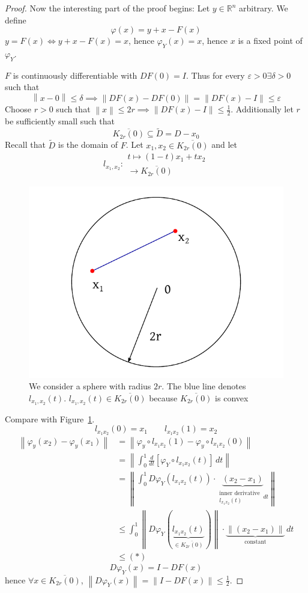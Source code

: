 \documentclass{article}
\newcommand{\norm}[1]{\left\|#1\right\|}
\begin{document}
\begin{proof}
  Now the interesting part of the proof begins:
  Let $y \in \mathbb R^n$ arbitrary. We define
  \[ \varphi(x) = y + x - F(x) \]
  $y = F(x) \iff y + x - F(x) = x$, hence $\varphi_Y(x) = x$, hence $x$ is a fixed point of $\varphi_Y$.
  
  $F$ is continuously differentiable with $DF(0) = I$. Thus for every $\varepsilon > 0 \exists \delta > 0$ such that
  \[ \norm{x - 0} \leq \delta \implies \norm{DF(x) - DF(0)} = \norm{DF(x) - I} \leq \varepsilon \]
  Choose $r > 0$ such that $\norm{x} \leq 2r \implies \norm{DF(x) - I} \leq \frac12$.
  Additionally let $r$ be sufficiently small such that
  \[ \overline{K_{2r}(0)} \subseteq \tilde D = D - x_0 \]
  Recall that $\tilde D$ is the domain of $F$.
  Let $x_1, x_2 \in \overline{K_{2r}(0)}$ and let
  \[ l_{x_1,x_2}: \substack{t \mapsto (1 - t) x_1 + t x_2 \\ [0, 1] \to \overline{K_{2r}(0)}} \]
  
  \begin{figure}[t]
    \begin{center}
      \includegraphics[width=.6\textwidth]{img/35_x1x2.pdf}
      \caption{We consider a sphere with radius $2r$. The blue line denotes $l_{x_1, x_2}(t)$. $l_{x_1, x_2}(t) \in \overline{K_{2r}(0)}$ because $\overline{K_{2r}(0)}$ is convex}
      \label{img:x1x2}
    \end{center}
  \end{figure}
  
  Compare with Figure~\ref{img:x1x2}.
  \[ l_{x_1 x_2}(0) = x_1 \qquad l_{x_1 x_2}(1) = x_2 \]
  \begin{align*}
    \norm{\varphi_y(x_2) - \varphi_y(x_1)}
      &= \norm{\varphi_y \circ l_{x_1 x_2}(1) - \varphi_y \circ l_{x_1 x_2}(0)} \\
      &= \norm{\int_0^1 \frac{d}{dt} [\varphi_Y \circ l_{x_1 x_2}(t)] \, dt} \\
      &= \norm{\int_0^1 D\varphi_Y(l_{x_1 x_2}(t)) \cdot \underbrace{\left(x_2 - x_1\right)}_{\substack{\text{inner derivative} \\ l_{x_1 x_2}(t)} \, dt}} \\
      &\leq \int_0^1 \norm{D\varphi_Y(\underbrace{l_{x_1 x_2}(t)}_{\in \overline{K_{2r}(0)}})} \cdot \underbrace{\norm{(x_2 - x_1)}}_{\text{constant}} \, dt \\
      &\leq (*)
  \end{align*}
  \[ D \varphi_Y(x) = I - DF(x) \]
  hence $\forall x \in \overline{K_{2r}(0)}$, $\norm{D\varphi_Y(x)} = \norm{I - DF(x)} \leq \frac12$.


\end{proof}
\end{document}
